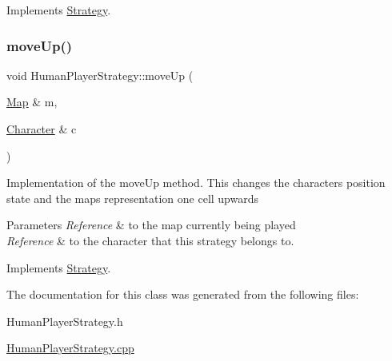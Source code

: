 Implements \hyperlink{classStrategy}{Strategy}.

\hypertarget{classHumanPlayerStrategy_a95dee54912e432a9f716eb6b09a5373c}{}\label{classHumanPlayerStrategy_a95dee54912e432a9f716eb6b09a5373c} 
\subsubsection{\texorpdfstring{move\+Up()}{moveUp()}}
{\footnotesize\ttfamily void Human\+Player\+Strategy\+::move\+Up (\begin{DoxyParamCaption}\item[{\hyperlink{classMap}{Map} \&}]{m,  }\item[{\hyperlink{classCharacter}{Character} \&}]{c }\end{DoxyParamCaption})\hspace{0.3cm}{\ttfamily [virtual]}}

Implementation of the move\+Up method. This changes the character\textquotesingle{}s position state and the map\textquotesingle{}s representation one cell upwards 
\begin{DoxyParams}{Parameters}
{\em Reference} & to the map currently being played \\
\hline
{\em Reference} & to the character that this strategy belongs to. \\
\hline
\end{DoxyParams}


Implements \hyperlink{classStrategy}{Strategy}.



The documentation for this class was generated from the following files\+:\begin{DoxyCompactItemize}
\item 
Human\+Player\+Strategy.\+h\item 
\hyperlink{HumanPlayerStrategy_8cpp}{Human\+Player\+Strategy.\+cpp}\end{DoxyCompactItemize}
